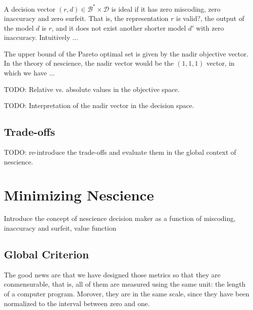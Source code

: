 A decision vector $(r, d) \in \mathcal{B}^\ast \times \mathcal{D}$ is ideal if it has zero miscoding, zero inaccuracy and zero surfeit. That is, the representation $r$ is valid?, the output of the model $d$ is $r$, and it does not exist another shorter model $d'$ with zero inaccuracy. {\color{red} Intuitively ...}

The upper bound of the Pareto optimal set is given by the nadir objective vector. In the theory of nescience, the nadir vector would be the $(1, 1, 1)$ vector, in which we have ...

{\color{red} TODO: Relative vs. absolute values in the objective space.}

{\color{red} TODO: Interpretation of the nadir vector in the decision space.}


\subsection{Trade-offs}

{\color{red} TODO: re-introduce the trade-offs and evaluate them in the global context of nescience.}

%
%

\section{Minimizing Nescience}

{\color{red} Introduce the concept of nescience decision maker as a function of miscoding, inaccuracy and surfeit, value function}


\subsection{Global Criterion}

{\color{red} The good news are that we have designed those metrics so that they are conmensurable, that is, all of them are measured using the same unit: the length of a computer program. Morover, they are in the same scale, since they have been normalized to the interval between zero and one.}

